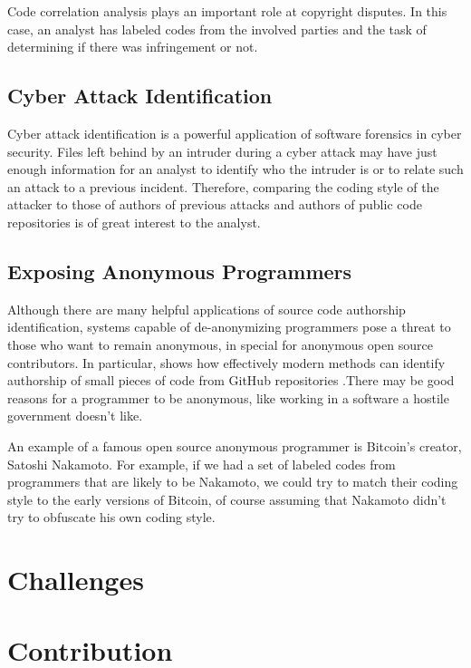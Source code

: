 Code correlation analysis plays an important role at copyright disputes. In this case, an analyst has labeled codes from the involved parties and the task of determining if there was infringement or not.

\subsection{Cyber Attack Identification}

Cyber attack identification is a powerful application of software forensics in cyber security. Files left behind by an intruder during a cyber attack may have just enough information for an analyst to identify who the intruder is or to relate such an attack to a previous incident. Therefore, comparing the coding style of the attacker to those of authors of previous attacks and authors of public code repositories is of great interest to the analyst.

\subsection{Exposing Anonymous Programmers}

Although there are many helpful applications of source code authorship identification, systems capable of de-anonymizing programmers pose a threat to those who want to remain anonymous, in special for anonymous open source contributors. In particular, \cite{gitblame} shows how effectively modern methods can identify authorship of small pieces of code from GitHub repositories .There may be good reasons for a programmer to be anonymous, like working in a software a hostile government doesn't like. 

An example of a famous open source anonymous programmer is Bitcoin's creator, Satoshi Nakamoto. For example, if we had a set of labeled codes from programmers that are likely to be Nakamoto, we could try to match their coding style to the early versions of Bitcoin, of course assuming that Nakamoto didn't try to obfuscate his own coding style.

\section{Challenges}

\section{Contribution}